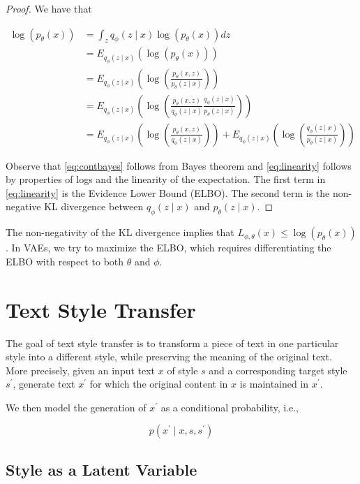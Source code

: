 \documentclass[11pt]{article}
\begin{document}
\begin{proof}
    We have that

    \begin{align}
        \log(p_{\theta}(x)) &= \int_{z}q_{\phi}(z\mid x)\log(p_{\theta}(x))dz \\
        &= E_{q_{\phi}(z\mid x)}\left(\log(p_{\theta}(x))\right) \\
        &= E_{q_{\phi}(z\mid x)}\left(\log\left(\frac{p_{\theta}(x,z)}{p_{\theta}(z\mid x)}\right)\right)\label{eq:contbayes} \\
        &= E_{q_{\phi}(z\mid x)}\left(\log\left(\frac{p_{\theta}(x,z)}{q_{\phi}(z\mid x)}\frac{q_{\phi}(z\mid x)}{p_{\theta}(z\mid x)}\right)\right) \\
        &= E_{q_{\phi}(z\mid x)}\left(\log\left(\frac{p_{\theta}(x,z)}{q_{\phi}(z\mid x)}\right) \right) + E_{q_{\phi}(z\mid x)}\left(\log\left(\frac{q_{\phi}(z\mid x)}{p_{\theta}(z\mid x)}\right) \right) \label{eq:linearity}
    \end{align}

    Observe that \eqref{eq:contbayes} follows from Bayes theorem and \eqref{eq:linearity} follows by properties of logs and the linearity of the expectation. The first term in \eqref{eq:linearity} is the Evidence Lower Bound (ELBO). The second term is the non-negative KL divergence between $q_{\phi}(z\mid x)$ and $p_{\theta}(z\mid x)$.
\end{proof}

The non-negativity of the KL divergence implies that $L_{\phi,\theta}(x)\leq \log(p_{\theta}(x))$. In VAEs, we try to maximize the ELBO, which requires differentiating the ELBO with respect to both $\theta$ and $\phi$.


\section{Text Style Transfer}
The goal of text style transfer is to transform a piece of text in one particular style into a different style, while preserving the meaning of the original text. More precisely, given an input text $x$ of style $s$ and a corresponding target style $s^{\prime}$, generate text $x^{\prime}$ for which the original content in $x$ is maintained in $x^{\prime}$.

We then model the generation of $x^{\prime}$ as a conditional probability, i.e.,

\begin{equation}
p(x^{\prime}\mid x,s,s^{\prime})
\end{equation}



\subsection{Style as a Latent Variable}



\end{document}
